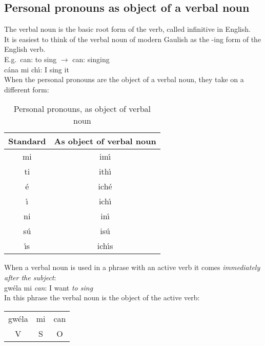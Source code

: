 \subsection{Personal pronouns as object of a verbal noun}

\noindent The verbal noun is the basic root form of the verb, called infinitive in English.\\

\noindent It is easiest to think of the verbal noun of modern Gaulish as the -ing form of the English verb.\\

\noindent E.g.\ can: to sing $\rightarrow$ can: singing\\
\noindent c\'{a}na mi ch\'{\i}: I sing it\\

\noindent When the personal pronouns are the object of a verbal noun, they take on a different form:
\begin{table}[H]
\centering
\begin{tabu}{c|c}
  \textbf{Standard} & \textbf{As object of verbal noun}\\
  \toprule
  mi & im\'{\i}\\
  ti & ith\'{\i}\\
  \'{e} & ich\'{e}\\
  \'{\i} & ich\'{\i}\\
  ni & in\'{\i}\\
  s\'{u} & is\'{u}\\
  \'{\i}s & ich\'{\i}s
\end{tabu}
\caption{Personal pronouns, as object of verbal noun}
\label{personal_pronouns_as_object_of_verbal_noun}
\end{table}

\noindent When a verbal noun is used in a phrase with an active verb it comes \textit{immediately after the subject}:\\

\noindent gw\'{e}la mi \textit{can}: I want \textit{to sing}\\

\noindent In this phrase the verbal noun is the object of the active verb:
\begin{table}[H]
\begin{tabu}{ccc}
  gw\'{e}la & mi & can\\
  V & S & O
\end{tabu}
\label{verbal_noun_object_of_active_verb}
\end{table}

